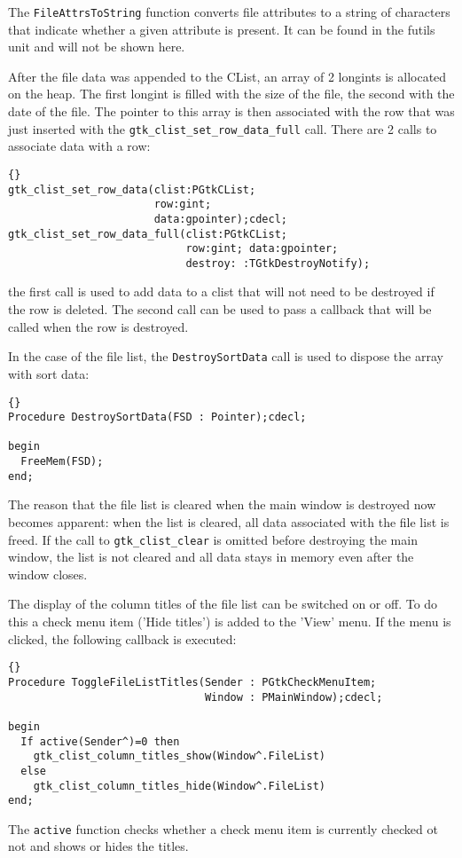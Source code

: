 \documentclass[10pt]{article}
\newcommand{\file}[1]{\textsf{#1}}
\begin{document}
The \lstinline|FileAttrsToString| function converts file attributes to a
string of characters that indicate whether a given attribute is present.
It can be found in the \file{futils} unit and will not be shown here.

After the file data was appended to the CList, an array of 2 longints is
allocated on the heap. The first longint is filled with the size of the
file, the second with the date of the file. The pointer to this array is
then associated with the row that was just inserted with the
\lstinline|gtk_clist_set_row_data_full| call. There are 2 calls to
associate data with a row:
\begin{lstlisting}{}
gtk_clist_set_row_data(clist:PGtkCList; 
                       row:gint; 
                       data:gpointer);cdecl;
gtk_clist_set_row_data_full(clist:PGtkCList; 
                            row:gint; data:gpointer; 
                            destroy: :TGtkDestroyNotify);
\end{lstlisting}
the first call is used to add data to a clist that will not need to be
destroyed if the row is deleted. The second call can be used to pass a
callback that will be called when the row is destroyed. 

In the case of the file list, the \lstinline|DestroySortData| call is
used to dispose the array with sort data:
\begin{lstlisting}{}
Procedure DestroySortData(FSD : Pointer);cdecl;
 
begin
  FreeMem(FSD);
end;                                                                            
\end{lstlisting}
The reason that the file list is cleared when the main window is destroyed
now becomes apparent: when the list is cleared, all data associated with
the file list is freed. If the call to \lstinline|gtk_clist_clear| is
omitted before destroying the main window, the list is not cleared and all
data stays in memory even after the window closes.

The display of the column titles of the file list can be switched on or off.
To do this a check menu item ('Hide titles') is added to the 'View' menu. 
If the menu is clicked, the following callback is executed:
\begin{lstlisting}{}
Procedure ToggleFileListTitles(Sender : PGtkCheckMenuItem;
                               Window : PMainWindow);cdecl;

begin
  If active(Sender^)=0 then
    gtk_clist_column_titles_show(Window^.FileList)
  else  
    gtk_clist_column_titles_hide(Window^.FileList)
end;
\end{lstlisting}
The \lstinline|active| function checks whether a check menu item is currently 
checked ot not and shows or hides the titles. 
\end{document}
